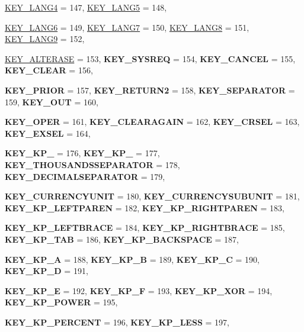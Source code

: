 \begin{DoxyCompactItemize}
\hyperlink{classMezzanine_1_1MetaCode_a3b5633f0145bf3287cf53a3f05b5563ca9ab5afd151e5819d606f715db47580d1}{KEY\_\-LANG4} =  147, 
\hyperlink{classMezzanine_1_1MetaCode_a3b5633f0145bf3287cf53a3f05b5563ca5d3155958167fb5b036786f964087d7d}{KEY\_\-LANG5} =  148, 
\par
\hyperlink{classMezzanine_1_1MetaCode_a3b5633f0145bf3287cf53a3f05b5563ca3bb4ebd085e21731083f843a91909382}{KEY\_\-LANG6} =  149, 
\hyperlink{classMezzanine_1_1MetaCode_a3b5633f0145bf3287cf53a3f05b5563ca59abbeb9fc2e7ac0e7ebc3b10b0c9f07}{KEY\_\-LANG7} =  150, 
\hyperlink{classMezzanine_1_1MetaCode_a3b5633f0145bf3287cf53a3f05b5563ca7e6061d23b720314f27b6606252d32df}{KEY\_\-LANG8} =  151, 
\hyperlink{classMezzanine_1_1MetaCode_a3b5633f0145bf3287cf53a3f05b5563cac8de0b01f0f17a1fac83b913494056cf}{KEY\_\-LANG9} =  152, 
\par
\hyperlink{classMezzanine_1_1MetaCode_a3b5633f0145bf3287cf53a3f05b5563caff5cd2f8773410b53df6d0ddf47758e3}{KEY\_\-ALTERASE} =  153, 
{\bfseries KEY\_\-SYSREQ} =  154, 
{\bfseries KEY\_\-CANCEL} =  155, 
{\bfseries KEY\_\-CLEAR} =  156, 
\par
{\bfseries KEY\_\-PRIOR} =  157, 
{\bfseries KEY\_\-RETURN2} =  158, 
{\bfseries KEY\_\-SEPARATOR} =  159, 
{\bfseries KEY\_\-OUT} =  160, 
\par
{\bfseries KEY\_\-OPER} =  161, 
{\bfseries KEY\_\-CLEARAGAIN} =  162, 
{\bfseries KEY\_\-CRSEL} =  163, 
{\bfseries KEY\_\-EXSEL} =  164, 
\par
{\bfseries KEY\_\-KP\_} =  176, 
{\bfseries KEY\_\-KP\_} =  177, 
{\bfseries KEY\_\-THOUSANDSSEPARATOR} =  178, 
{\bfseries KEY\_\-DECIMALSEPARATOR} =  179, 
\par
{\bfseries KEY\_\-CURRENCYUNIT} =  180, 
{\bfseries KEY\_\-CURRENCYSUBUNIT} =  181, 
{\bfseries KEY\_\-KP\_\-LEFTPAREN} =  182, 
{\bfseries KEY\_\-KP\_\-RIGHTPAREN} =  183, 
\par
{\bfseries KEY\_\-KP\_\-LEFTBRACE} =  184, 
{\bfseries KEY\_\-KP\_\-RIGHTBRACE} =  185, 
{\bfseries KEY\_\-KP\_\-TAB} =  186, 
{\bfseries KEY\_\-KP\_\-BACKSPACE} =  187, 
\par
{\bfseries KEY\_\-KP\_\-A} =  188, 
{\bfseries KEY\_\-KP\_\-B} =  189, 
{\bfseries KEY\_\-KP\_\-C} =  190, 
{\bfseries KEY\_\-KP\_\-D} =  191, 
\par
{\bfseries KEY\_\-KP\_\-E} =  192, 
{\bfseries KEY\_\-KP\_\-F} =  193, 
{\bfseries KEY\_\-KP\_\-XOR} =  194, 
{\bfseries KEY\_\-KP\_\-POWER} =  195, 
\par
{\bfseries KEY\_\-KP\_\-PERCENT} =  196, 
{\bfseries KEY\_\-KP\_\-LESS} =  197, 

\end{DoxyCompactItemize}
